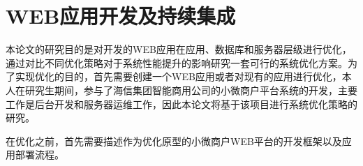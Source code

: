 \chapter{WEB应用开发及持续集成}
\label{cha:web}
本论文的研究目的是对开发的WEB应用在应用、数据库和服务器层级进行优化，通过对比不同优化策略对于系统性能提升的影响研究一套可行的系统优化方案。为了实现优化的目的，首先需要创建一个WEB应用或者对现有的应用进行优化，本人在研究生期间，参与了海信集团智能商用公司的小微商户平台系统的开发，主要工作是后台开发和服务器运维工作，因此本论文将基于该项目进行系统优化策略的研究。

在优化之前，首先需要描述作为优化原型的小微商户WEB平台的开发框架以及应用部署流程。


